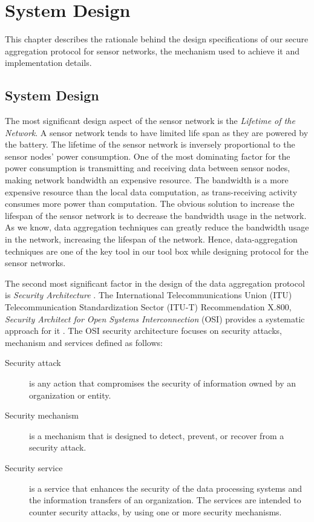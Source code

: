 \chapter{System Design} %
\label{cha:System Design}
	
	This chapter describes the rationale behind the design specifications of our secure aggregation protocol for sensor networks, the mechanism used to achieve it and implementation details.

	\section{System Design}

	The most significant design aspect of the sensor network is the \textit{Lifetime of the Network}.
	A sensor network tends to have limited life span as they are powered by the battery.
	The lifetime of the sensor network is inversely proportional to the sensor nodes' power consumption.
	One of the most dominating factor for the power consumption is transmitting and receiving data between sensor nodes, making network bandwidth an expensive resource.
	The bandwidth is a more expensive resource than the local data computation, as trans-receiving activity consumes more power than computation.
	The obvious solution to increase the lifespan of the sensor network is to decrease the bandwidth usage in the network.
	As we know, data aggregation techniques can greatly reduce the bandwidth usage in the network, increasing the lifespan of the network.
	Hence, data-aggregation techniques are one of the key tool in our tool box while designing protocol for the sensor networks.

	The second most significant factor in the design of the data aggregation protocol is \textit{Security Architecture }.
	The International Telecommunications Union (ITU) Telecommunication Standardization Sector (ITU-T) Recommendation X.800, \textit{Security Architect for Open Systems Interconnection} (OSI) provides a systematic approach for it \cite{stallings2008computer}.
	The OSI security architecture focuses on security attacks, mechanism and services defined as follows:
	\begin{description}
	\item[Security attack] is any action that compromises the security of information owned by an organization or entity.
	\item[Security mechanism] is a mechanism that is designed to detect, prevent, or recover from a security attack.
	\item[Security service] is a service that enhances the security of the data processing systems and the information transfers of an organization. The services are intended to counter security attacks, by using one or more security mechanisms.
	\end{description}

